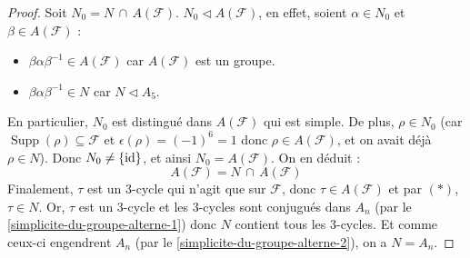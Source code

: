 \begin{proof}
    \newpar
    Soit $N_0 = N \, \cap \, A(\mathcal{F})$. $N_0 \lhd A(\mathcal{F})$, en effet, soient $\alpha \in N_0$ et $\beta \in A(\mathcal{F})$ :
    \begin{itemize}
      \item $\beta \alpha \beta^{-1} \in A(\mathcal{F})$ car $A(\mathcal{F})$ est un groupe.
      \item $\beta \alpha \beta^{-1} \in N$ car $N \lhd A_5$.
    \end{itemize}
    En particulier, $N_0$ est distingué dans $A(\mathcal{F})$ qui est simple. De plus, $\rho \in N_0$ (car $\operatorname{Supp}(\rho) \subseteq \mathcal{F}$ et $\epsilon(\rho) = (-1)^{6} = 1$ donc $\rho \in A(\mathcal{F})$, et on avait déjà $\rho \in N$). Donc $N_0 \neq \{ \operatorname{id} \}$, et ainsi $N_0 = A(\mathcal{F})$. On en déduit :
    \[ A(\mathcal{F}) = N \, \cap \, A(\mathcal{F}) \tag{$*$} \]
    Finalement, $\tau$ est un $3$-cycle qui n'agit que sur $\mathcal{F}$, donc $\tau \in A(\mathcal{F})$ et par $(*)$, $\tau \in N$. Or, $\tau$ est un $3$-cycle et les $3$-cycles sont conjugués dans $A_n$ (par le \cref{simplicite-du-groupe-alterne-1}) donc $N$ contient tous les $3$-cycles. Et comme ceux-ci engendrent $A_n$ (par le \cref{simplicite-du-groupe-alterne-2}), on a $N = A_n$.
  \end{proof}

